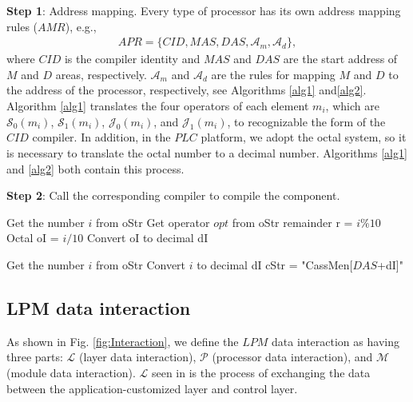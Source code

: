 \documentclass[journal,UTF8]{IEEEtran}
\begin{document}
\textbf{Step 1}: Address mapping. Every type of processor has its own address mapping rules ($AMR$), e.g.,
 \begin{eqnarray}
  APR = \{CID, MAS, DAS, \mathcal{A}_m, \mathcal{A}_d\},
 \end{eqnarray}
where $CID$ is the compiler identity and $MAS$ and $DAS$ are the start address of $M$ and $D$ areas, respectively. $\mathcal{A}_m$ and $\mathcal{A}_d$ are the rules for mapping $M$ and $D$ to the address of the processor, respectively, see Algorithms \ref{alg1} and\ref{alg2}. Algorithm \ref{alg1} translates the four operators of each element $m_i$, which are $\mathcal{S}_0(m_i)$, $\mathcal{S}_1(m_i)$, $\mathcal{J}_0(m_i)$, and $\mathcal{J}_1(m_i)$, to recognizable the form of the $CID$ compiler. In addition, in the $PLC$ platform, we adopt the octal system, so it is necessary to translate the octal number to a decimal number. Algorithms \ref{alg1} and \ref{alg2} both contain this process.
 
 
\textbf{Step 2}: Call the corresponding compiler to compile the component.


\begin{algorithm}
	\label{alg1}
	\caption{$\mathcal{A}_m$}%
	Get the number $i$ from oStr\; 
	Get operator $opt$ from oStr\;
	remainder r = $i\%10$\;
	Octal oI =  $i/10$\;
	Convert oI to decimal dI\; 
\end{algorithm}
\begin{algorithm}
	\label{alg2}
	\caption{$\mathcal{A}_d$}%
	Get the number $i$ from oStr\; 
	Convert $i$ to decimal dI\; 
	cStr = "CassMen[$DAS$+dI]"\;
\end{algorithm}


 
 \subsection{LPM data interaction}
 As shown in Fig. \ref{fig:Interaction}, we define the $LPM$ data interaction as having three parts: $\mathcal{L}$ (layer data interaction), $\mathcal{P}$ (processor data interaction), and $\mathcal{M}$ (module data interaction). $\mathcal{L}$ seen in \cite{WuA} is the process of exchanging the data between the application-customized layer and control layer.
\end{document}

